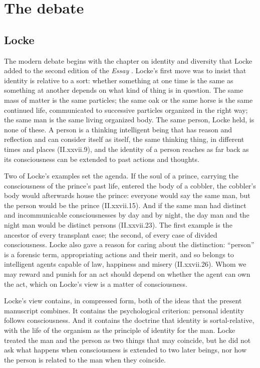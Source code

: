 \documentclass{situationist-preprint}
\begin{document}
\section{The debate}\label{s:history}

\subsection{Locke}

The modern debate begins with the chapter on identity and diversity that Locke added to the second edition of the \emph{Essay} \citep[II.xxvii]{Locke1694}. Locke's first move was to insist that identity is relative to a sort: whether something at one time is the same as something at another depends on what kind of thing is in question. The same mass of matter is the same particles; the same oak or the same horse is the same continued life, communicated to successive particles organized in the right way; the same man is the same living organized body. The same person, Locke held, is none of these. A person is a thinking intelligent being that has reason and reflection and can consider itself as itself, the same thinking thing, in different times and places (II.xxvii.9), and the identity of a person reaches as far back as its consciousness can be extended to past actions and thoughts.

Two of Locke's examples set the agenda. If the soul of a prince, carrying the consciousness of the prince's past life, entered the body of a cobbler, the cobbler's body would afterwards house the prince: everyone would say the same man, but the person would be the prince (II.xxvii.15). And if the same man had distinct and incommunicable consciousnesses by day and by night, the day man and the night man would be distinct persons (II.xxvii.23). The first example is the ancestor of every transplant case; the second, of every case of divided consciousness. Locke also gave a reason for caring about the distinction: \enquote{person} is a forensic term, appropriating actions and their merit, and so belongs to intelligent agents capable of law, happiness and misery (II.xxvii.26). Whom we may reward and punish for an act should depend on whether the agent can own the act, which on Locke's view is a matter of consciousness.

Locke's view contains, in compressed form, both of the ideas that the present manuscript combines. It contains the psychological criterion: personal identity follows consciousness. And it contains the doctrine that identity is sortal-relative, with the life of the organism as the principle of identity for the man. Locke treated the man and the person as two things that may coincide, but he did not ask what happens when consciousness is extended to two later beings, nor how the person is related to the man when they coincide.
\end{document}
